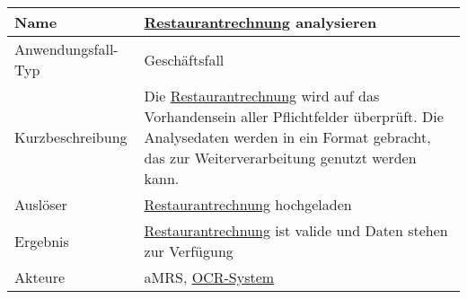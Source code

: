 \begin{table}[H]
    \centering
    \label{RestaurantRechnungAnalysieren}
    \begin{tabularx}{\textwidth}{| l | X |}
        \hline
        Name               & \hyperref[gls:restaurantRechnung]{Restaurantrechnung} analysieren                                                                                                                                                       \\
        \hline
        Anwendungsfall-Typ & Geschäftsfall                                                                                                                                                                                                           \\
        \hline
        Kurzbeschreibung   & Die \hyperref[gls:restaurantRechnung]{Restaurantrechnung} wird auf das Vorhandensein aller Pflichtfelder überprüft. Die Analysedaten werden in ein Format gebracht, das zur Weiterverarbeitung genutzt werden kann. \\
        \hline
        Auslöser           & \hyperref[gls:restaurantRechnung]{Restaurantrechnung} hochgeladen                                                                                                                                                       \\
        \hline
        Ergebnis           & \hyperref[gls:restaurantRechnung]{Restaurantrechnung} ist valide und Daten stehen zur Verfügung                                                                                                                         \\
        \hline
        Akteure            & \ac{aMRS}, \hyperref[gls:ocr-System]{OCR-System}                                                                                                                                                                \\
        \hline
    \end{tabularx}
\end{table}


